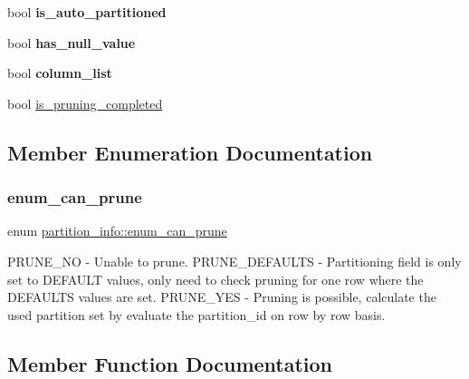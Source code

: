 \begin{DoxyCompactItemize}
\mbox{\label{classpartition__info_ace17e5f60c33624d58764ffca2d638db}} 
bool {\bfseries is\+\_\+auto\+\_\+partitioned}
\item 
\mbox{\label{classpartition__info_a3bad3a6591bfb09a608537016d55ad23}} 
bool {\bfseries has\+\_\+null\+\_\+value}
\item 
\mbox{\label{classpartition__info_af6039a95b692ba2c577f3c647b2b561b}} 
bool {\bfseries column\+\_\+list}
\item 
bool \mbox{\hyperlink{classpartition__info_a4de898d070131804a841bd7535098eb1}{is\+\_\+pruning\+\_\+completed}}
\end{DoxyCompactItemize}


\subsection{Member Enumeration Documentation}
\mbox{\label{classpartition__info_aaef02282065db06059d0d77a6d6096e9}} 
\subsubsection{\texorpdfstring{enum\+\_\+can\+\_\+prune}{enum\_can\_prune}}
{\footnotesize\ttfamily enum \mbox{\hyperlink{classpartition__info_aaef02282065db06059d0d77a6d6096e9}{partition\+\_\+info\+::enum\+\_\+can\+\_\+prune}}}

P\+R\+U\+N\+E\+\_\+\+NO -\/ Unable to prune. P\+R\+U\+N\+E\+\_\+\+D\+E\+F\+A\+U\+L\+TS -\/ Partitioning field is only set to D\+E\+F\+A\+U\+LT values, only need to check pruning for one row where the D\+E\+F\+A\+U\+L\+TS values are set. P\+R\+U\+N\+E\+\_\+\+Y\+ES -\/ Pruning is possible, calculate the used partition set by evaluate the partition\+\_\+id on row by row basis. 

\subsection{Member Function Documentation}
\mbox{\label{classpartition__info_a79b9f2066ee5adbf961db510b676ffb3}} 
